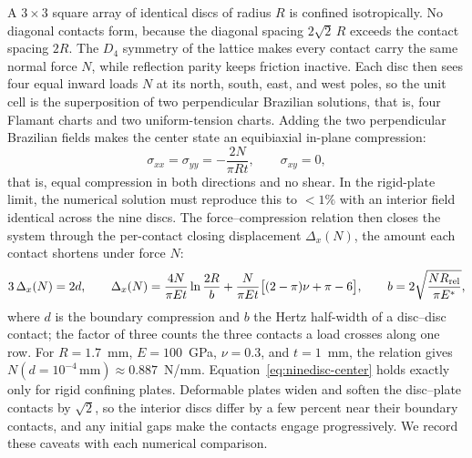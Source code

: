 A $3\times3$ square array of identical discs of radius $R$ is confined isotropically. No
diagonal contacts form, because the diagonal spacing $2\sqrt2\,R$ exceeds the contact
spacing $2R$. The $D_4$ symmetry of the lattice makes every contact carry the same normal
force $N$, while reflection parity keeps friction inactive. Each disc then sees four equal
inward loads $N$ at its north, south, east, and west poles, so the unit cell is the
superposition of two perpendicular Brazilian solutions, that is, four Flamant charts and
two uniform-tension charts. Adding the two perpendicular Brazilian fields makes the center
state an equibiaxial in-plane compression:
\begin{equation}\label{eq:ninedisc-center}
  \sigma_{xx} = \sigma_{yy} = -\frac{2N}{\pi R t}, \qquad \sigma_{xy}=0,
\end{equation}
that is, equal compression in both directions and no shear. In the rigid-plate limit, the
numerical solution must reproduce this to $<1\%$ with an interior field identical across
the nine discs. The force--compression relation then closes the system through the
per-contact closing displacement $\Delta_x(N)$, the amount each contact shortens under
force $N$:
\begin{equation}\label{eq:ninedisc-force}
  3\,\Delta_x(N) = 2d, \qquad
  \Delta_x(N) = \frac{4N}{\pi E t}\ln\frac{2R}{b}
  + \frac{N}{\pi E t}\big[(2-\pi)\nu + \pi - 6\big],
  \qquad
  b = 2\sqrt{\frac{N R_{\rm rel}}{\pi E^\ast}},
\end{equation}
where $d$ is the boundary compression and $b$ the Hertz half-width of a disc--disc
contact; the factor of three counts the three contacts a load crosses along one row. For
$R=1.7$~mm, $E=100$~GPa, $\nu=0.3$, and $t=1$~mm, the relation gives
$N(d{=}10^{-4}\,\text{mm}) \approx 0.887$~N/mm. Equation~\eqref{eq:ninedisc-center} holds
exactly only for rigid confining plates. Deformable plates widen and soften the disc--plate
contacts by $\sqrt2$, so the interior discs differ by a few percent near their boundary
contacts, and any initial gaps make the contacts engage progressively. We record these
caveats with each numerical comparison.

